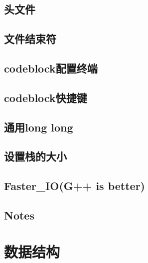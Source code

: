 \documentclass[a4paper]{article}
\begin{document}
\begin{CJK*}{UTF8}{gbsn}
\begin{multicols}{3}
\begin{flushleft}
\subsection{头文件}


\subsection{文件结束符}


\subsection{codeblock配置终端}


\subsection{codeblock快捷键}


\subsection{通用long long}


\subsection{设置栈的大小}


\subsection{Faster\_IO(G++ is better)}



\subsection{Notes}




\clearpage 

\section{数据结构}


\end{flushleft}
\end{multicols}
\end{CJK*}
\end{document}
